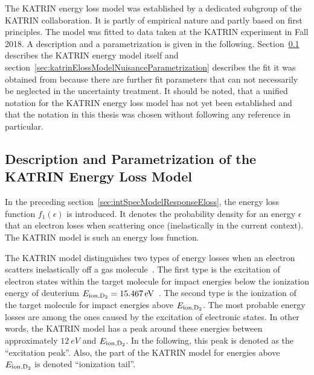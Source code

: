 The KATRIN energy loss model was established by a dedicated subgroup of the KATRIN collaboration. It is partly of empirical nature and partly based on first principles. The model was fitted to data taken at the KATRIN experiment in Fall 2018. A description and a parametrization is given in the following. Section~\ref{sec:katrinElossModelMainParametrization} describes the KATRIN energy model itself and section~\ref{sec:katrinElossModelNuisanceParametrization} describes the fit it was obtained from because there are further fit parameters that can not necessarily be neglected in the uncertainty treatment. It should be noted, that a unified notation for the KATRIN energy loss model has not yet been established and that the notation in this thesis was chosen without following any reference in particular.

\subsection{Description and Parametrization of the KATRIN Energy Loss Model}
\label{sec:katrinElossModelMainParametrization}
In the preceding section~\ref{sec:intSpecModelResponseEloss}, the energy loss function $f_1(\epsilon)$ is introduced. It denotes the probability density for an energy $\epsilon$ that an electron loses when scattering once (inelastically in the current context). The KATRIN model is such an energy loss function.

The KATRIN model distinguishes two types of energy losses when an electron scatters inelastically off a gas molecule~\cite{Hannen2019_2}. The first type is the excitation of electron states within the target molecule for impact energies below the ionization energy of deuterium $E_\mathrm{ion,D_2}=\SI{15.467}{eV}$~\cite{Shiner1993}. The second type is the ionization of the target molecule for impact energies above $E_\mathrm{ion,D_2}$. The most probable energy losses are among the ones caused by the excitation of electronic states. In other words, the KATRIN model has a peak around these energies between approximately $\SI{12}{eV}$ and $E_\mathrm{ion,D_2}$. In the following, this peak is denoted as the ``excitation peak''. Also, the part of the KATRIN model for energies above $E_\mathrm{ion,D_2}$ is denoted ``ionization tail''.

